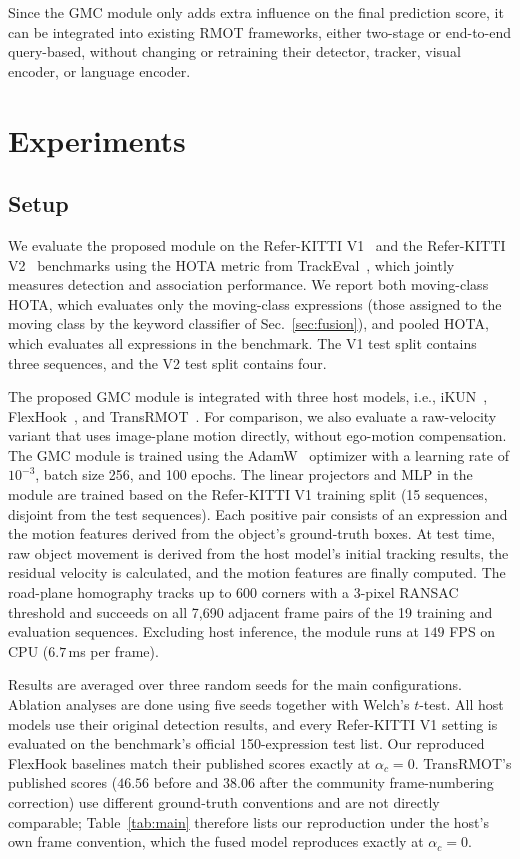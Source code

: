 \documentclass{article}
\begin{document}
Since the GMC module only adds extra influence on the final prediction score, it can be integrated into existing RMOT frameworks, either two-stage or end-to-end query-based, without changing or retraining their detector, tracker, visual encoder, or language encoder.

\section{Experiments}
\label{sec:exp}


\subsection{Setup}
\label{sec:setup}
We evaluate the proposed module on the Refer-KITTI V1~\cite{transrmot} and the Refer-KITTI V2~\cite{temprmot} benchmarks using the HOTA metric from TrackEval~\cite{hota}, which jointly measures detection and association performance. We report both moving-class HOTA, which evaluates only the moving-class expressions (those assigned to the moving class by the keyword classifier of Sec.~\ref{sec:fusion}), and pooled HOTA, which evaluates all expressions in the benchmark. The V1 test split contains three sequences, and the V2 test split contains four.

The proposed GMC module is integrated with three host models, i.e., iKUN~\cite{ikun}, FlexHook~\cite{flexhook}, and TransRMOT~\cite{transrmot}. For comparison, we also evaluate a raw-velocity variant that uses image-plane motion directly, without ego-motion compensation. The GMC module is trained using the AdamW~\cite{adamw} optimizer with a learning rate of $10^{-3}$, batch size 256, and 100 epochs. The linear projectors and MLP in the module are trained based on the Refer-KITTI V1 training split (15 sequences, disjoint from the test sequences). Each positive pair consists of an expression and the motion features derived from the object's ground-truth boxes. At test time, raw object movement is derived from the host model's initial tracking results, the residual velocity is calculated, and the motion features are finally computed. The road-plane homography tracks up to 600 corners with a 3-pixel RANSAC threshold and succeeds on all 7,690 adjacent frame pairs of the 19 training and evaluation sequences. Excluding host inference, the module runs at $149$ FPS on CPU ($6.7$\,ms per frame).

Results are averaged over three random seeds for the main configurations. Ablation analyses are done using five seeds together with Welch's $t$-test. All host models use their original detection results, and every Refer-KITTI V1 setting is evaluated on the benchmark's official 150-expression test list. Our reproduced FlexHook baselines match their published scores exactly at $\alpha_c{=}0$. TransRMOT's published scores ($46.56$ before and $38.06$ after the community frame-numbering correction) use different ground-truth conventions and are not directly comparable; Table~\ref{tab:main} therefore lists our reproduction under the host's own frame convention, which the fused model reproduces exactly at $\alpha_c{=}0$.
\end{document}
